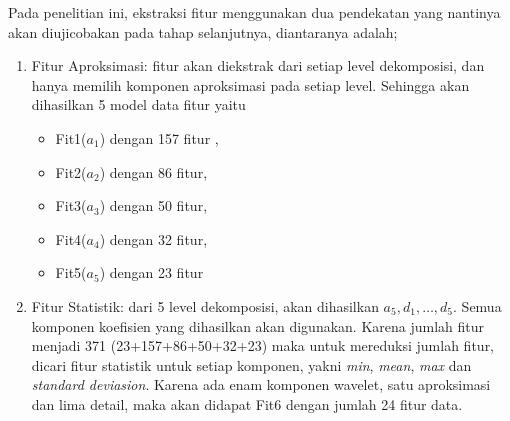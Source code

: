 Pada penelitian ini, ekstraksi fitur menggunakan dua pendekatan yang nantinya
akan diujicobakan pada tahap selanjutnya, diantaranya adalah;
\begin{enumerate}
  \item Fitur Aproksimasi: fitur akan diekstrak dari setiap level dekomposisi,
  dan hanya memilih komponen aproksimasi pada setiap level. Sehingga akan
  dihasilkan 5 model data fitur yaitu 
  \begin{itemize}
    \item Fit1($a_1$) dengan 157 fitur , 
    \item Fit2($a_2$) dengan 86 fitur, 
    \item Fit3($a_3$) dengan 50 fitur,
    \item Fit4($a_4$) dengan 32 fitur, 
    \item Fit5($a_5$) dengan 23 fitur 
  \end{itemize}
   
  \item Fitur Statistik: dari 5 level dekomposisi, akan dihasilkan
  $a_5,d_1,\dots,d_5$. Semua komponen koefisien yang dihasilkan akan digunakan.
  Karena jumlah fitur menjadi 371 (23+157+86+50+32+23) maka untuk mereduksi
  jumlah fitur, dicari fitur statistik untuk setiap komponen,  yakni \emph{min},
  \emph{mean}, \emph{max} dan \emph{standard deviasion}. Karena  ada enam
  komponen wavelet, satu aproksimasi dan lima detail, maka akan  didapat Fit6
  dengan jumlah 24 fitur data.
\end{enumerate} 




